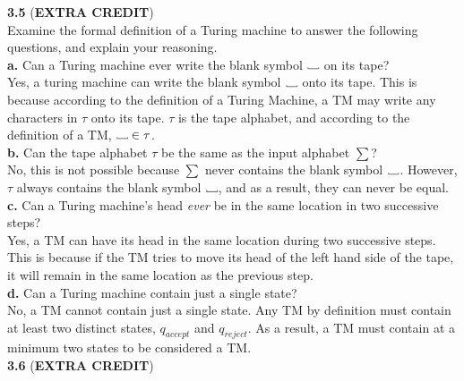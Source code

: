 \documentclass[12pt]{article}
\newcommand\Vtextvisiblespace[1][.8em]{%
	\mbox{\kern.07em\vrule height.3ex}%
	\vbox{\hrule width#1}%
	\hbox{\vrule height.3ex}}
\begin{document}

\pagebreak
\textbf{3.5} (\textbf{EXTRA CREDIT}) \\
Examine the formal definition of a Turing machine to answer the following questions,
and explain your reasoning. \\

\textbf{a.} Can a Turing machine ever write the blank symbol $\Vtextvisiblespace$ on its tape? \\

Yes, a turing machine can write the blank symbol $\Vtextvisiblespace$ onto its tape.
This is because according to the definition of a Turing Machine, a TM may write any
characters in $\tau$ onto its tape. $\tau$ is the tape alphabet, and according to the
definition of a TM, $\Vtextvisiblespace \in \tau $. \\

\textbf{b.} Can the tape alphabet $\tau$ be the same as the input alphabet $\sum$? \\

No, this is not possible because $\sum$ never contains the blank symbol $\Vtextvisiblespace$.
However, $\tau$ always contains the blank symbol $\Vtextvisiblespace$, and as a result,
they can never be equal. \\

\textbf{c.} Can a Turing machine’s head \textit{ever} be in the same location in two successive 
steps? \\

Yes, a TM can have its head in the same location during two successive steps. This is because
if the TM tries to move its head of the left hand side of the tape, it will remain in the same
location as the previous step. \\

\textbf{d.} Can a Turing machine contain just a single state? \\

No, a TM cannot contain just a single state. Any TM by definition must contain at least
two distinct states, $q_{accept}$ and $q_{reject}$. As a result, a TM must contain
at a minimum two states to be considered a TM. \\

\pagebreak
\textbf{3.6} (\textbf{EXTRA CREDIT}) \\
\end{document}
